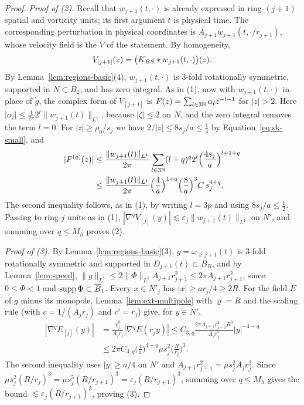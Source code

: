 \begin{proof}
\emph{Proof of (2).} Recall that $w_{j+1}(t,\cdot)$ is already expressed in
ring-$(j+1)$ spatial and vorticity units; its first argument $t$ is physical
time. The corresponding perturbation in physical coordinates is
$A_{j+1}w_{j+1}(t,\cdot/r_{j+1})$, whose velocity field is the $V$ of the
statement. By homogeneity,
\[
V_{[j+1]}(z)=\big(K_{BS}\ast w_{j+1}(t,\cdot)\big)(z).
\]
By Lemma~\ref{lem:regions-basic}(4), $w_{j+1}(t,\cdot)$ is $3$-fold
rotationally symmetric, supported in $N\subset\overline B_2$, and has zero
integral. As in (1), now with $w_{j+1}(t,\cdot)$ in place of $\tilde g$, the
complex form of $V_{[j+1]}$ is
$F(z)=\sum_{l\in 3\mathbb{N}}\alpha_lz^{-l-1}$ for $|z|>2$. Here
$|\alpha_l|\le\frac1{2\pi}2^l\|w_{j+1}(t)\|_{L^1}$, because $|\zeta|\le2$ on $N$,
and the zero integral removes the term $l=0$.
For $|z|\ge\rho_0/s_j$ we have $2/|z|\le8s_j/a\le\frac14$ by
Equation~\eqref{eq:sk-small}, and
\[
\begin{aligned}
|F^{(q)}(z)|&\le\frac{\|w_{j+1}(t)\|_{L^1}}{2\pi}\sum_{l\in 3\mathbb{N}}(l+q)^q2^l\Big(\frac{4s_j}a\Big)^{l+1+q}\\
&\le\frac{\|w_{j+1}(t)\|_{L^1}}{2\pi}\Big(\frac4a\Big)^{1+q}\Big(\frac8a\Big)^3C\,s_j^{4+q}.
\end{aligned}
\]
The second inequality follows, as in (1), by writing $l=3p$ and using
$8s_j/a\le\frac12$. Passing to ring-$j$ units as in (1),
$|\nabla^qV_{[j]}(y)|\lesssim\varepsilon_j\|w_{j+1}(t)\|_{L^1}$
on $N'$, and summing over $q\le M_h$ proves (2).

\emph{Proof of (3).} By Lemma~\ref{lem:regions-basic}(3), $g=\omega_{\ge j+1}(t)$
is $3$-fold rotationally symmetric and supported in $D_{j+1}(t)\subset\overline B_R$, and by
Lemma~\ref{lem:speed}, $\|g\|_{L^1}\le2\|\Phi\|_{L^1}A_{j+1}r_{j+1}^2\le2\pi
A_{j+1}r_{j+1}^2$, since $0\le\Phi<1$ and $\operatorname{supp}\Phi\subset\overline B_1$. Every
$x\in N'_j$ has $|x|\ge ar_j/4\ge2R$. For the field $E$ of $g$ minus its
monopole, Lemma~\ref{lem:ext-multipole} with $\varrho=R$ and the scaling rule
(with $c=1/(A_jr_j)$ and $c'=r_j$) give, for $y\in N'$,
\begin{align*}
|\nabla^qE_{[j]}(y)|&=\frac{r_j^{q}}{A_jr_j}|\nabla^qE(r_jy)|
\le C_{3,q}\frac{2\pi A_{j+1}r_{j+1}^2R^3}{A_jr_j^5}|y|^{-4-q}\\
&\le2\pi C_{3,q}\Big(\frac4a\Big)^{4+q}\mu s_j^2\Big(\frac R{r_j}\Big)^3 .
\end{align*}
The second inequality uses $|y|\ge a/4$ on $N'$ and
$A_{j+1}r_{j+1}^2=\mu s_j^2A_jr_j^2$. Since $\mu s_j^2(R/r_j)^3=\mu s_j^5(R/r_{j+1})^3=\varepsilon_j(R/r_{j+1})^3$,
summing over $q\le M_h$ gives the bound
$\lesssim\varepsilon_j(R/r_{j+1})^3$, proving (3).


\end{proof}

